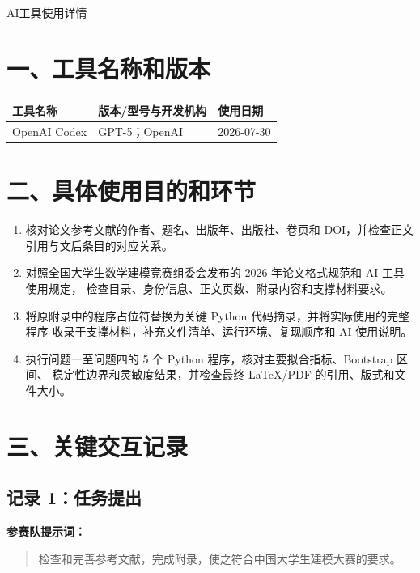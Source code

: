 \documentclass[11pt,a4paper]{ctexart}
\begin{document}
\begin{center}
{\heiti AI工具使用详情}
\end{center}

\section*{一、工具名称和版本}

\begin{longtable}{p{3.4cm}p{4.2cm}p{5.6cm}}
\toprule
工具名称 & 版本/型号与开发机构 & 使用日期 \\
\midrule
OpenAI Codex & GPT-5；OpenAI & 2026-07-30 \\
\bottomrule
\end{longtable}

\section*{二、具体使用目的和环节}

\begin{enumerate}[leftmargin=2em]
  \item 核对论文参考文献的作者、题名、出版年、出版社、卷页和 DOI，并检查正文引用与文后条目的对应关系。
  \item 对照全国大学生数学建模竞赛组委会发布的 2026 年论文格式规范和 AI 工具使用规定，
        检查目录、身份信息、正文页数、附录内容和支撑材料要求。
  \item 将原附录中的程序占位符替换为关键 Python 代码摘录，并将实际使用的完整程序
        收录于支撑材料，补充文件清单、运行环境、复现顺序和 AI 使用说明。
  \item 执行问题一至问题四的 5 个 Python 程序，核对主要拟合指标、Bootstrap 区间、
        稳定性边界和灵敏度结果，并检查最终 LaTeX/PDF 的引用、版式和文件大小。
\end{enumerate}

\section*{三、关键交互记录}

\subsection*{记录 1：任务提出}

\textbf{参赛队提示词：}

\begin{quote}
检查和完善参考文献，完成附录，使之符合中国大学生建模大赛的要求。
\end{quote}
\end{document}
